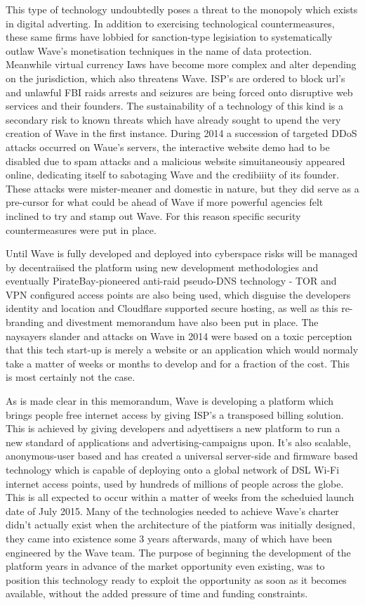 \documentclass[letterpaper,10pt,openany,oneside,english]{sphinxmanual}
\begin{document}
This type of technology undoubtedly poses a threat to the monopoly which exists in digital adverting. In addition to exercising technological countermeasures, these same firms have lobbied for sanction-type legisiation to systematically outlaw Wave’s monetisation techniques in the name of data protection. Meanwhile virtual currency Iaws have become more complex and alter depending on the jurisdiction, which also threatens Wave. ISP’s are ordered to block url’s and unlawful FBI raids arrests and seizures are being forced onto disruptive web services and their founders. The sustainability of a technology of this kind is a secondary risk to known threats which have already sought to upend the very creation of Wave in the first instance. During 2014 a succession of targeted DDoS attacks occurred on Waue’s servers, the interactive website demo had to be disabled due to spam attacks and a malicious website simuitaneousiy appeared online, dedicating itself to sabotaging Wave and the credibiiity of its founder. These attacks were mister-meaner and domestic in nature, but they did serve as a pre-cursor for what could be ahead of Wave if more powerful agencies felt inclined to try and stamp out Wave. For this reason specific security countermeasures were put in place.

Until Wave is fully developed and deployed into cyberspace risks will be managed by decentraiised the platform using new development methodologies and eventually PirateBay-pioneered anti-raid pseudo-DNS technology - TOR and VPN configured access points are also being used, which disguise the developers identity and location and Cloudflare supported secure hosting, as well as this re-branding and divestment memorandum have also been put in place. The naysayers slander and attacks on Wave in 2014 were based on a toxic perception that this tech start-up is merely a website or an application which would normaly take a matter of weeks or months to develop and for a fraction of the cost. This is most certainly not the case.

As is made clear in this memorandum, Wave is developing a platform which brings people free internet access by giving ISP’s a transposed billing solution. This is achieved by giving developers and adyettisers a new platform to run a new standard of applications and advertising-campaigns upon. It’s also scalable, anonymous-user based and has created a universal server-side and firmware based technology which is capable of deploying onto a global network of DSL Wi-Fi internet access points, used by hundreds of millions of people across the globe. This is all expected to occur within a matter of weeks from the scheduied launch date of July 2015. Many of the technologies needed to achieve Wave’s charter didn’t actually exist when the architecture of the piatform was initially designed, they came into existence some 3 years afterwards, many of which have been engineered by the Wave team. The purpose of beginning the development of the platform years in advance of the market opportunity even existing, was to position this technology ready to exploit the opportunity as soon as it becomes available, without the added pressure of time and funding constraints.
\end{document}
